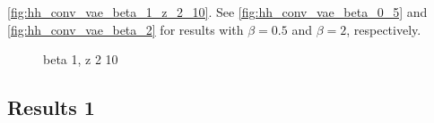 \autoref{fig:hh_conv_vae_beta_1_z_2_10}. See \autoref{fig:hh_conv_vae_beta_0_5} and \autoref{fig:hh_conv_vae_beta_2} for results with $\beta=0.5$ and $\beta=2$, respectively.


\begin{figure}[!htb]
\centering
{}
\qquad
{}
\caption{beta 1, z 2 10 }
\label{fig:hh_conv_vae_beta_1_z_2_10}
\end{figure}


\subsection{Results 1}\label{sec:project results}

